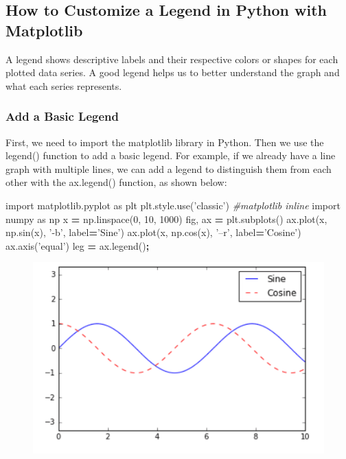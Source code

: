 \documentclass[]{book}
\newenvironment{Shaded}{\begin{snugshade}}{\end{snugshade}}
\newcommand{\DecValTok}[1]{\textcolor[rgb]{0.00,0.00,0.81}{#1}}
\newcommand{\StringTok}[1]{\textcolor[rgb]{0.31,0.60,0.02}{#1}}
\newcommand{\ImportTok}[1]{#1}
\newcommand{\CommentTok}[1]{\textcolor[rgb]{0.56,0.35,0.01}{\textit{#1}}}
\newcommand{\OperatorTok}[1]{\textcolor[rgb]{0.81,0.36,0.00}{\textbf{#1}}}
\newcommand{\NormalTok}[1]{#1}
\theoremstyle{definition}
\theoremstyle{definition}
\theoremstyle{definition}
\theoremstyle{remark}
\begin{document}
\subsection{How to Customize a Legend in Python with
Matplotlib}\label{how-to-customize-a-legend-in-python-with-matplotlib}

A legend shows descriptive labels and their respective colors or shapes
for each plotted data series. A good legend helps us to better
understand the graph and what each series represents.

\subsubsection{Add a Basic Legend}\label{add-a-basic-legend}

First, we need to import the matplotlib library in Python. Then we use
the legend() function to add a basic legend. For example, if we already
have a line graph with multiple lines, we can add a legend to
distinguish them from each other with the ax.legend() function, as shown
below:

\begin{Shaded}
\begin{Highlighting}[]
\ImportTok{import}\NormalTok{ matplotlib.pyplot }\ImportTok{as}\NormalTok{ plt}
\NormalTok{plt.style.use(}\StringTok{'classic'}\NormalTok{)}
\CommentTok{#matplotlib inline}
\ImportTok{import}\NormalTok{ numpy }\ImportTok{as}\NormalTok{ np}
\NormalTok{x }\OperatorTok{=}\NormalTok{ np.linspace(}\DecValTok{0}\NormalTok{, }\DecValTok{10}\NormalTok{, }\DecValTok{1000}\NormalTok{)}
\NormalTok{fig, ax }\OperatorTok{=}\NormalTok{ plt.subplots()}
\NormalTok{ax.plot(x, np.sin(x), }\StringTok{'-b'}\NormalTok{, label}\OperatorTok{=}\StringTok{'Sine'}\NormalTok{)}
\NormalTok{ax.plot(x, np.cos(x), }\StringTok{'--r'}\NormalTok{, label}\OperatorTok{=}\StringTok{'Cosine'}\NormalTok{)}
\NormalTok{ax.axis(}\StringTok{'equal'}\NormalTok{)}
\NormalTok{leg }\OperatorTok{=}\NormalTok{ ax.legend()}\OperatorTok{;}
\end{Highlighting}
\end{Shaded}

\begin{figure}
\centering
\includegraphics{images/legend1.png}
\caption{}
\end{figure}
\end{document}
